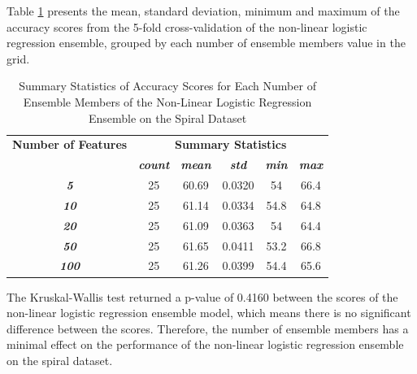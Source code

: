 \documentclass[10pt, conference]{IEEEtran}
\begin{document}
Table \ref{table: S_member_nonlinear_performance_metrics} presents the mean, standard deviation, minimum and maximum of the
accuracy scores from the 5-fold cross-validation of the non-linear logistic regression ensemble, grouped by each number of ensemble members
value in the grid.
\begin{table}[H]
    \caption{Summary Statistics of Accuracy Scores for Each Number of Ensemble Members of the Non-Linear Logistic Regression Ensemble on the Spiral Dataset}
    \begin{center}
        \begin{tabular}{|c||c|c|c|c|c|}
            \hline
            \textbf{Number of Features}&\multicolumn{5}{|c|}{\textbf{Summary Statistics}} \\
            \cline{2-6}
                                &\textbf{\textit{count}} & \textbf{\textit{mean}} & \textbf{\textit{std}} & \textbf{\textit{min}} & \textbf{\textit{max}}\\
            \hline
            \textbf{\textit{5}}   & 25 & 60.69 & 0.0320 & 54 & 66.4 \\
            \textbf{\textit{10}}  & 25 & 61.14 & 0.0334 & 54.8 & 64.8 \\
            \textbf{\textit{20}}  & 25 & 61.09 & 0.0363 & 54 & 64.4 \\
            \textbf{\textit{50}}  & 25 & 61.65 & 0.0411 & 53.2 & 66.8 \\
            \textbf{\textit{100}} & 25 & 61.26 & 0.0399 & 54.4 & 65.6 \\
            \hline
        \end{tabular}
    \end{center}
    \label{table: S_member_nonlinear_performance_metrics}
\end{table}
The Kruskal-Wallis test returned a p-value of 0.4160 between the scores of the non-linear logistic regression ensemble model,
which means there is no significant difference between the scores. Therefore, the number of ensemble members
has a minimal effect on the performance of the non-linear logistic regression ensemble on the spiral dataset.
\end{document}
